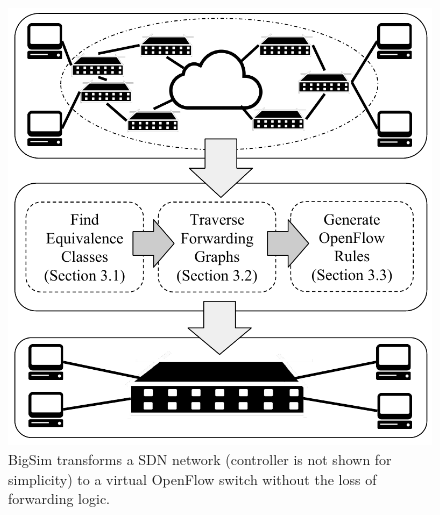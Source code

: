 \begin{figure}[t]
\centering
\includegraphics[scale=.6]{figures/BigSimOverview.pdf}
\caption{BigSim transforms a SDN network (controller is not shown for simplicity) to a virtual OpenFlow switch without the loss of forwarding logic.}
\label{Fig:BigSimOverview}
\end{figure}

